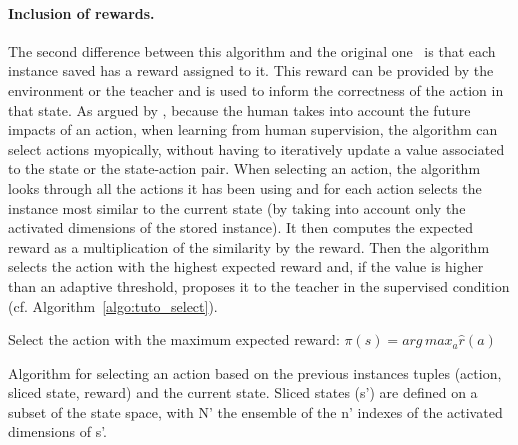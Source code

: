 \paragraph{Inclusion of rewards.} 
The second difference between this algorithm and the original one~\citep{cover1967nearest} is that each instance saved has a reward assigned to it. This reward can be provided by the environment or the teacher and is used to inform the correctness of the action in that state. As argued by \cite{knox2009interactively}, because the human takes into account the future impacts of an action, when learning from human supervision, the algorithm can select actions myopically, without having to iteratively update a value associated to the state or the state-action pair. When selecting an action, the algorithm looks through all the actions it has been using and for each action selects the instance most similar to the current state (by taking into account only the activated dimensions of the stored instance). It then computes the expected reward as a multiplication of the similarity by the reward. Then the algorithm selects the action with the highest expected reward and, if the value is higher than an adaptive threshold, proposes it to the teacher in the supervised condition (cf. Algorithm~\ref{algo:tuto_select}). 

\begin{algorithm}
	\DontPrintSemicolon
	Select the action with the maximum expected reward:
	$\pi(s) = arg\, max_{a} \hat{r}(a)$
	
	\caption{Algorithm for selecting an action based on the previous instances tuples (action, sliced state, reward) and the current state. Sliced states (s') are defined on a subset of the state space, with N' the ensemble of the n' indexes of the activated dimensions of s'.}
	\label{algo:tuto_select}
\end{algorithm}

